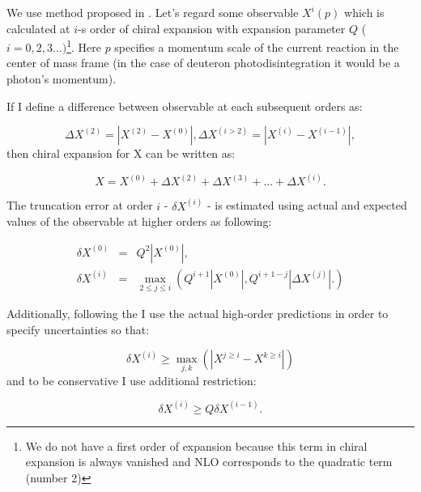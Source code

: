     We use method proposed in \cite{Binder2015}.
    Let's regard some observable $X^i(p)$ which is calculated at $i$-s order of chiral expansion 
    with expansion parameter $Q$ ($i = 0,2,3...)$\footnote{We do not have a first order of expansion
    because this term in chiral expansion is always vanished
    and NLO  corresponds to the quadratic term (number 2)}.
    Here $p$ specifies a momentum
    scale of the current reaction in the center of mass frame (in the case of deuteron photodisintegration it would be a
    photon's momentum).  

    If I define a difference between observable at each subsequent orders as:

    \begin{equation}
        \Delta X^{(2)} = |X^{(2)} - X^{(0)}|, \Delta X^{(i>2)} = |X^{(i)} - X^{(i-1)}|,
    \end{equation}
    then chiral expansion for X can be written as:

    \begin{equation}
        X = X^{(0)} + \Delta X^{(2)} + \Delta X^{(3)} + ... + \Delta X^{(i)}.
        \label{trunc1}
    \end{equation}
        
    The truncation error at order $i$ - $\delta X^{(i)}$ - is estimated using
    actual and expected values of the observable at 
    higher orders as following:

    \begin{eqnarray}
        \delta X^{(0)} &=& Q^2 \left| X^{(0)} \right| \label{trunc2},\\ 
        \delta X^{(i)} &=& \max_{2 \leq j \leq i} \left( Q^{i+1} \left| X^{(0)} \right|,
        Q^{i+1-j} \left| \Delta X^{(j)} \right|. \right) \label{trunc3} 
    \end{eqnarray}

    Additionally, following the \cite{Binder2015} I use the actual high-order predictions 
    in order to specify uncertainties so that:

    \begin{equation}
        \delta X^{(i)} \geq \max_{j,k} (|X^{j \geq i} - X^{k \geq i}|)
        \label{trunc4}
    \end{equation}
    and to be conservative I use additional restriction:

    \begin{equation}
        \delta X^{(i)} \geq Q \delta X^{(i-1)}.
        \label{trunc5}
    \end{equation}

